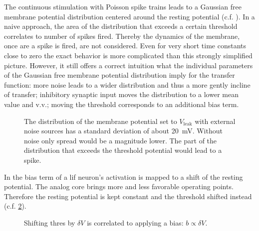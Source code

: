 The continuous stimulation with Poisson spike trains leads to a Gaussian free membrane potential distribution centered around the resting potential (c.f. \cite{mihaiphd}). In a naive approach, the area of the distribution that exceeds a certain threshold correlates to number of spikes fired. Thereby the dynamics of the membrane, once are a spike is fired, are not considered. Even for very short time constants close to zero the exact behavior is more complicated than this strongly simplified picture. However, it still offers a correct intuition what the individual parameters of the Gaussian free membrane potential distribution imply for the transfer function: more noise leads to a wider distribution and thus a more gently incline of \gls{transfer}; inhibitory synaptic input moves the distribution to a lower mean value and v.v.; moving the threshold corresponds to an additional bias term.

\begin{figure}
	\label{vleak_w_noise}
	\begin{center}
		
	\end{center}
	\caption{The distribution of the membrane potential set to $V_{\text{leak}}$ with external noise sources has a standard deviation of about \SI{20}{\milli\V}. Without noise only spread would be a magnitude lower. The part of the distribution that exceeds the threshold potential would lead to a spike.}
\end{figure}

In \cite{petrovici2016stochastic} the bias term of a \gls{lif} neuron's activation is mapped to a shift of the resting potential. The analog core brings more and less favorable operating points. Therefore the resting potential is kept constant and the threshold shifted instead (c.f. \cref{transferfunction_with_bias}).

\begin{figure}
	\label{transferfunction_with_bias}
	\begin{center}
		
	\end{center}
	\caption{Shifting \gls{thres} by $\delta V$ is correlated to applying a bias: $b \propto \delta V$.}
\end{figure}



%
%


